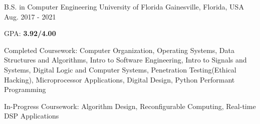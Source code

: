 

\begin{cventries}

  \cventry
    {B.S. in Computer Engineering} %
    {University of Florida} %
    {Gainesville, Florida, USA} %
    {Aug. 2017 - 2021} %
    {
      \begin{cvitems} %
        \item {GPA: \textbf{3.92/4.00}}
        \item {Completed Coursework: Computer Organization, Operating Systems, Data Structures and Algorithms, Intro to Software Engineering, Intro to Signals and Systems, Digital Logic and Computer Systems,  Penetration Testing(Ethical Hacking), Microprocessor Applications, Digital Design, Python Performant Programming}
        \item {In-Progress Coursework: Algorithm Design, Reconfigurable Computing, Real-time DSP Applications}
      \end{cvitems}
    }

\end{cventries}
